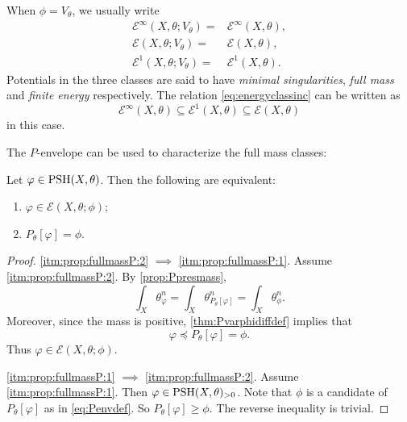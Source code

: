 When $\phi=V_{\theta}$, we usually write
\[
    \begin{aligned}
        \mathcal{E}^{\infty}(X,\theta;V_{\theta})=& \mathcal{E}^{\infty}(X,\theta),\\
        \mathcal{E}(X,\theta;V_{\theta})=& \mathcal{E}(X,\theta),\\
        \mathcal{E}^{1}(X,\theta;V_{\theta})=& \mathcal{E}^{1}(X,\theta).
    \end{aligned}
\]
Potentials in the three classes are said to have \emph{minimal singularities}, \emph{full mass} and \emph{finite energy} respectively. The relation \eqref{eq:energyclassinc} can be written as
\[
\mathcal{E}^{\infty}(X,\theta)\subseteq \mathcal{E}^{1}(X,\theta) \subseteq \mathcal{E}(X,\theta)
\]
in this case.

The $P$-envelope can be used to characterize the full mass classes:
\begin{proposition}\label{prop:fullmassP}
    Let $\varphi\in \mathrm{PSH}(X,\theta)$. Then the following are equivalent:
    \begin{enumerate}
        \item\label{itm:prop:fullmassP:1} $\varphi\in \mathcal{E}(X,\theta;\phi)$;
        \item\label{itm:prop:fullmassP:2} $P_{\theta}[\varphi]=\phi$.
    \end{enumerate}
\end{proposition}
\begin{proof}
    \ref{itm:prop:fullmassP:2} $\implies$ \ref{itm:prop:fullmassP:1}. Assume \ref{itm:prop:fullmassP:2}. By \cref{prop:Ppresmass},
    \[
    \int_X\theta_\varphi^n=\int_X\theta_{P_\theta[\varphi]}^n=\int_X\theta_\phi^n.
    \]
    Moreover, since the mass is positive, \cref{thm:Pvarphidiffdef} implies that
    \[
        \varphi\preceq P_\theta[\varphi]=\phi.
    \]
    Thus $\varphi\in\mathcal E(X,\theta;\phi)$.

    \ref{itm:prop:fullmassP:1} $\implies$ \ref{itm:prop:fullmassP:2}. Assume \ref{itm:prop:fullmassP:1}. Then $\varphi\in \mathrm{PSH}(X,\theta)_{>0}$.
    Note that $\phi$ is a candidate of $P_{\theta}[\varphi]$ as in \eqref{eq:Penvdef}. So $P_{\theta}[\varphi]\geq \phi$. The reverse inequality is trivial.
\end{proof}

